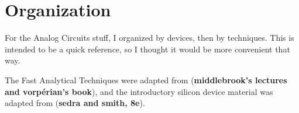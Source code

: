 \documentclass[12pt]{report}
\begin{document}

\newpage
\tableofcontents
\newpage
\chapter*{Organization}
For the Analog Circuits stuff, I organized by devices, then by techniques. This is intended to be a quick reference, so I thought it would be more convenient that way.

The Fast Analytical Techniques were adapted from (\textbf{middlebrook's lectures and vorpérian's book}), and the introductory silicon device material was adapted from (\textbf{sedra and smith, 8e}).
\newpage








\end{document}
